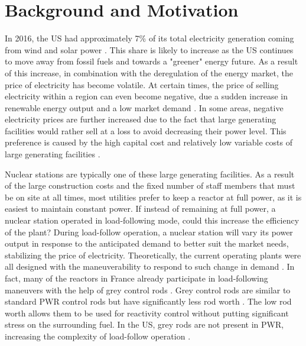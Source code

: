 \documentclass[edeposit,fullpage,12pt]{uiucthesis2009}
\begin{document}
\section{Background and Motivation}

In 2016, the \gls{US} had approximately 7\% of its total electricity generation coming from wind and solar power \cite{u.s_energy_information_administration_electricity_2016}. 
This share is likely to increase as the \gls{US} continues to move away from fossil fuels and towards a "greener" energy future.
As a result of this increase, in combination with the deregulation of the energy market, the price of electricity has become volatile. 
At certain times, the price of selling electricity within a region can even become negative, due a sudden increase in renewable energy output and a low market demand \cite{paraschiv_impact_2014}. 
In some areas, negative electricity prices are further increased due to the fact that large generating facilities would rather sell at a loss to avoid decreasing their power level. 
This preference is caused by the high capital cost and relatively low variable costs of large generating facilities \cite{lokhov_load-following_2011}.

Nuclear stations are typically one of these large generating facilities.
As a result of the large construction costs and the fixed number of staff members that must be on site at all times, most utilities prefer to keep a reactor at full power, as it is easiest to maintain constant power. 
If instead of remaining at full power, a nuclear station operated in load-following mode, could this increase the efficiency of the plant?
During load-follow operation, a nuclear station will vary its power output in response to the anticipated demand to better suit the market needs, stabilizing the price of electricity.
Theoretically, the current operating plants were all designed with the maneuverability to respond to such change in demand \cite{lokhov_technical_2011}.
In fact, many of the reactors in France already participate in load-following maneuvers with the help of grey control rods \cite{lokhov_technical_2011}.
Grey control rods are similar to standard \gls{PWR} control rods but have significantly less rod worth \cite{yousefpour_improvement_2000}.
The low rod worth allows them to be used for reactivity control without putting significant stress on the surrounding fuel. 
In the \gls{US}, grey rods are not present in \gls{PWR}, increasing the complexity of load-follow operation \cite{lokhov_technical_2011}.
  
\end{document}
